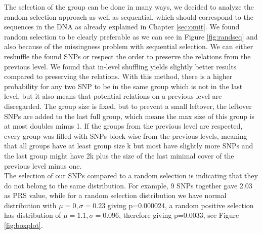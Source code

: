 \documentclass[letterpaper, 11pt]{article}
\begin{document}
The selection of the group can be done in many ways, we decided to analyze the random selection approach as well as sequential, which should correspond to the sequences in the DNA as already explained in Chapter \ref{sec:omit}. We found random selection to be clearly preferable as we can see in Figure \ref{fig:randseq} and also because of the missingness problem with sequential selection.
We can either reshuffle the found SNPs or respect the order to preserve the relations from the previous level. We found that in-level shuffling yields slightly better results compared to preserving the relations. With this method, there is a higher probability for any two SNP to be in the same group which is not in the last level, but it also means that potential relations on a previous level are disregarded. 
The group size is fixed, but to prevent a small leftover, the leftover SNPs are added to the last full group, which means the max size of this group is at most doubles minus 1. If the groups from the previous level are respected, every group was filled with SNPs block-wise from the previous levels, meaning that all groups have at least group size k but most have slightly more SNPs and the last group might have 2k plus the size of the last minimal cover of the previous level minus one. \\

The selection of our SNPs compared to a random selection is indicating that they do not belong to the same distribution. For example, 9 SNPs together gave 2.03 as PRS value, while for a random selection distribution we have normal distribution with $\mu =0, \sigma=0.23$ giving p=0.000024, a random positive selection has distribution of $\mu =1.1, \sigma=0.096$, therefore giving p=0.0033, see Figure \ref{fig:boxplot}.

  
\end{document}
